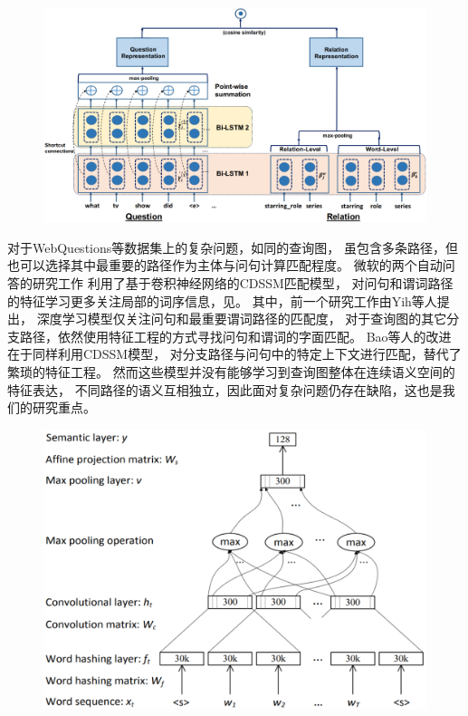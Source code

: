 \begin{figure}[ht]
\centering
\includegraphics[width=0.95\columnwidth]{figure/rw/qa-hrbilstm.png}
\label{fig:rw-siamese:a}
\end{figure}

对于WebQuestions等数据集上的复杂问题，如同的查询图，
虽包含多条路径，但也可以选择其中最重要的路径作为主体与问句计算匹配程度。
微软的两个自动问答的研究工作\parencite{yih2015semantic,bao2016constraint}
利用了基于卷积神经网络的CDSSM匹配模型\cite{shen2014learning}，
对问句和谓词路径的特征学习更多关注局部的词序信息，见。
其中，前一个研究工作由Yih等人\cite{yih2015semantic}提出，
深度学习模型仅关注问句和最重要谓词路径的匹配度，
对于查询图的其它分支路径，依然使用特征工程的方式寻找问句和谓词的字面匹配。
Bao等人\cite{bao2016constraint}的改进在于同样利用CDSSM模型，
对分支路径与问句中的特定上下文进行匹配，替代了繁琐的特征工程。
然而这些模型并没有能够学习到查询图整体在连续语义空间的特征表达，
不同路径的语义互相独立，因此面对复杂问题仍存在缺陷，这也是我们的研究重点。

\begin{figure}[ht]
\centering
\includegraphics[width=0.6\columnwidth]{figure/rw/qa-cdssm.png}
\label{fig:rw-siamese:b}
\end{figure}

